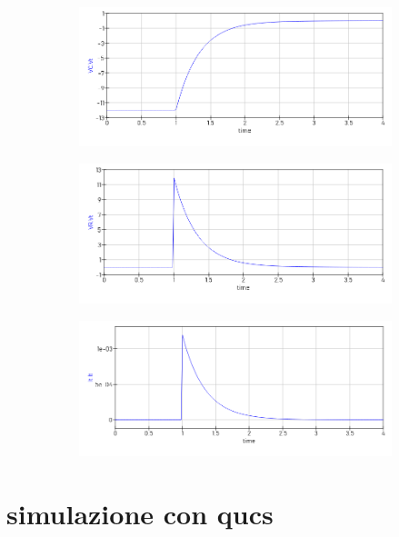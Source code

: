 \documentclass{article}
\begin{document}
\begin{figure}[h!]
  \centering
  \begin{subfigure}[b]{0.3\linewidth}
    \includegraphics[width=\linewidth]{data/scarica-VC.png}
  \end{subfigure}
  \begin{subfigure}[b]{0.3\linewidth}
    \includegraphics[width=\linewidth]{data/scarica-VR.png}
  \end{subfigure}
  \begin{subfigure}[b]{0.3\linewidth}
    \includegraphics[width=\linewidth]{data/scarica-IT.png}
  \end{subfigure}
\end{figure}

\newpage

\section*{simulazione con qucs}
\end{document}
